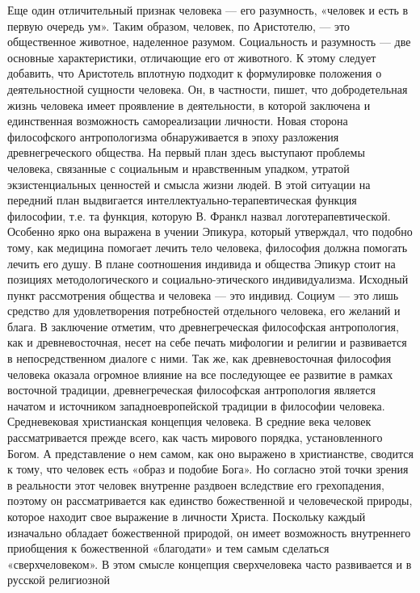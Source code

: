 \documentclass[12pt]{article}
\begin{document}
Еще один отличительный признак человека — его разумность, «человек и есть в первую очередь ум». Таким
образом, человек, по Аристотелю, — это общественное животное, наделенное разумом. Социальность и
разумность — две основные характеристики, отличающие его от животного.
К этому следует добавить, что Аристотель вплотную подходит к формулировке положения о деятельностной
сущности человека. Он, в частности, пишет, что добродетельная жизнь человека имеет проявление в
деятельности, в которой заключена и единственная возможность самореализации личности.
Новая сторона философского антропологизма обнаруживается в эпоху разложения древнегреческого общества.
На первый план здесь выступают проблемы человека, связанные с социальным и нравственным упадком,
утратой экзистенциальных ценностей и смысла жизни людей. В этой ситуации на передний план выдвигается
интеллектуально-терапевтическая функция философии, т.е. та функция, которую В. Франкл назвал
логотерапевтической. Особенно ярко она выражена в учении Эпикура, который утверждал, что подобно тому,
как медицина помогает лечить тело человека, философия должна помогать лечить его душу. В плане
соотношения индивида и общества Эпикур стоит на позициях методологического и социально-этического
индивидуализма. Исходный пункт рассмотрения общества и человека — это индивид. Социум — это лишь
средство для удовлетворения потребностей отдельного человека, его желаний и блага.
В заключение отметим, что древнегреческая философская антропология, как и древневосточная, несет на себе
печать мифологии и религии и развивается в непосредственном диалоге с ними.
Так же, как древневосточная философия человека оказала огромное влияние на все последующее ее развитие в
рамках восточной традиции, древнегреческая философская антропология является начатом и источником
западноевропейской традиции в философии человека.
Средневековая христианская концепция человека.
В средние века человек рассматривается прежде всего, как часть мирового порядка, установленного Богом. А
представление о нем самом, как оно выражено в христианстве, сводится к тому, что человек есть «образ и
подобие Бога». Но согласно этой точки зрения в реальности этот человек внутренне раздвоен вследствие его
грехопадения, поэтому он рассматривается как единство божественной и человеческой природы, которое 
находит свое выражение в личности Христа. Поскольку каждый изначально обладает божественной природой,
он имеет возможность внутреннего приобщения к божественной «благодати» и тем самым сделаться
«сверхчеловеком». В этом смысле концепция сверхчеловека часто развивается и в русской религиозной
\end{document}
